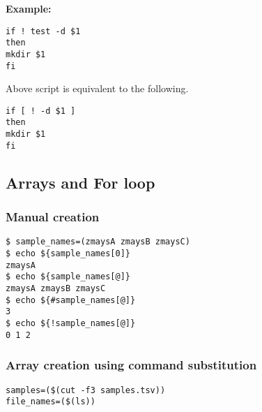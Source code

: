 \textbf{Example:}\\

\begin{mdframed}
\texttt{if ! test -d \$1}\\
\texttt{then}\\
\texttt{mkdir \$1}\\
\texttt{fi}
\end{mdframed}

Above script is equivalent to the following.\\

\begin{mdframed}
\texttt{if [ ! -d \$1 ]}\\
\texttt{then}\\
\texttt{mkdir \$1}\\
\texttt{fi}
\end{mdframed}

\null

\subsection{Arrays and For loop}

\subsubsection{Manual creation}
\begin{mdframed}

\texttt{\$ sample\_names=(zmaysA zmaysB zmaysC)}\\
\texttt{\$ echo \$\{sample\_names[0]\}}\\
\texttt{zmaysA}\\
\texttt{\$ echo \$\{sample\_names[@]\}}\\
\texttt{zmaysA zmaysB zmaysC}\\
\texttt{\$ echo \$\{\#sample\_names[@]\}}\\
\texttt{3}\\
\texttt{\$ echo \$\{!sample\_names[@]\}}\\
\texttt{0 1 2}
\end{mdframed}

\subsubsection{Array creation using command substitution}
\begin{mdframed}
\texttt{samples=(\$(cut -f3 samples.tsv))}\\
\texttt{file\_names=(\$(ls))}
\end{mdframed}


